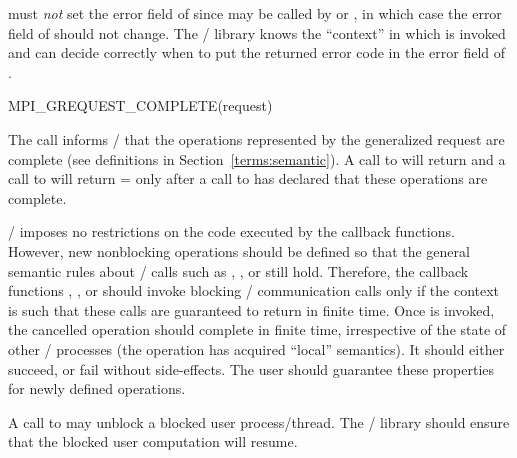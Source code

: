 \begin{users}
 must \emph{not} set the error field of
since  may be called by  or
, in which case the error field of 
should not change.  The \MPI/ library knows the ``context'' in which
 is invoked and can decide correctly when to put
the returned error code in the error field of .
\end{users}

%
\begin{funcdef}{MPI\_GREQUEST\_COMPLETE}{(\mbox{request})}
\end{funcdef}

The call informs \MPI/ that the operations represented by the generalized request
 are 
complete (see 
definitions in Section~\ref{terms:semantic}).
A call to  will return and a call to
 will return  = 
only after a call to  has declared that
these operations are complete.

\MPI/ imposes no restrictions on the code executed by the callback functions.
However, new nonblocking operations should be defined so that the general
semantic rules about \MPI/ calls such as ,
, or  still hold. 
Therefore, the
callback functions , , or
 should invoke blocking \MPI/ communication
calls only if the context is such that these calls are guaranteed to
return in finite time.  
Once  is invoked, the cancelled operation
should complete in finite time, irrespective of the state of
other \MPI/ processes (the operation has acquired ``local'' semantics).  It
should either succeed, or fail without side-effects.  The user should
guarantee these properties for newly defined operations.  

\begin{implementors}
A call to  may unblock a blocked user
process/thread. The \MPI/ library should ensure that the blocked user
computation will resume.
\end{implementors}

